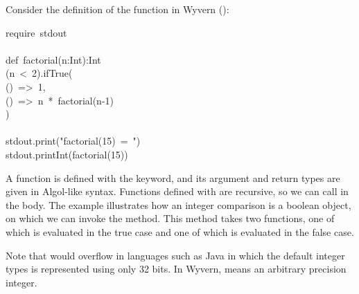 \documentclass{article}
\begin{document}
\noindent{}Consider the definition of the  function in Wyvern ():%
\begin{mdpre}%
\noindent require~stdout\\
\\
def~factorial(n:Int):Int\\
(n~\textless{}~2).ifTrue(\\
()~=\textgreater{}~1,\\
()~=\textgreater{}~n~*~factorial(n-1)\\
)\\
\\
stdout.print("factorial(15)~=~")\\
stdout.printInt(factorial(15))%
\end{mdpre}\noindent{}A function is defined with the  keyword, and its argument and
return types are given in Algol-like syntax.  Functions defined with
 are recursive, so we can call  in the body.  The
example illustrates how an integer comparison  is a boolean object,
on which we can invoke the  method.  This method takes two
functions, one of which is evaluated in the true case and one of which
is evaluated in the false case.

Note that  would overflow in languages such
as Java in which the default integer types is represented using only
32 bits.  In Wyvern,  means an arbitrary precision integer.%
\end{document}
